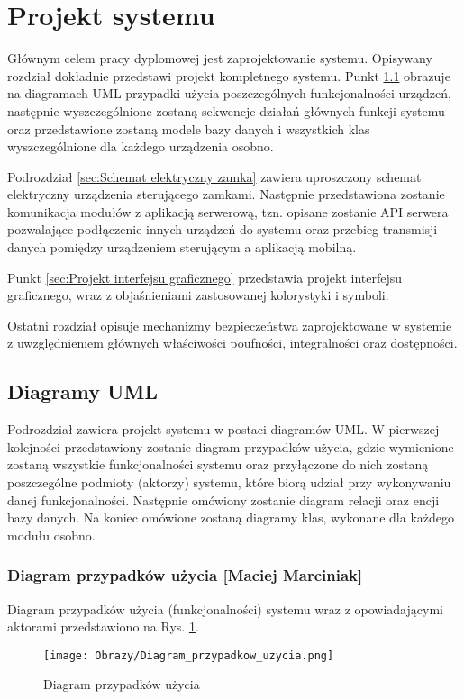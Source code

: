 % 
\newpage\section{Projekt systemu \textsl{\NazwaSys}}\label{sec:projekt}
Głównym celem pracy dyplomowej jest zaprojektowanie systemu. Opisywany rozdział dokładnie przedstawi projekt kompletnego systemu. Punkt \ref{sec:Diagramy UML} obrazuje na diagramach UML przypadki użycia poszczególnych funkcjonalności urządzeń, następnie wyszczególnione zostaną sekwencje działań głównych funkcji systemu oraz przedstawione zostaną modele bazy danych i wszystkich klas wyszczególnione dla każdego urządzenia osobno. 

Podrozdział \ref{sec:Schemat elektryczny zamka} zawiera uproszczony schemat elektryczny urządzenia sterującego zamkami. Następnie przedstawiona zostanie komunikacja modułów z aplikacją serwerową, tzn. opisane zostanie API serwera pozwalające podłączenie innych urządzeń do systemu oraz przebieg transmisji danych pomiędzy urządzeniem sterującym a aplikacją mobilną.

Punkt \ref{sec:Projekt interfejsu graficznego} przedstawia projekt interfejsu graficznego, wraz z objaśnieniami zastosowanej kolorystyki i symboli.

Ostatni rozdział opisuje mechanizmy bezpieczeństwa zaprojektowane w systemie z uwzględnieniem głównych właściwości poufności, integralności oraz dostępności.

\subsection{Diagramy UML}\label{sec:Diagramy UML}
Podrozdział zawiera projekt systemu w postaci diagramów UML. W pierwszej kolejności przedstawiony zostanie diagram przypadków użycia, gdzie wymienione zostaną wszystkie funkcjonalności systemu oraz przyłączone do nich zostaną poszczególne podmioty (aktorzy) systemu, które biorą udział przy wykonywaniu danej funkcjonalności. Następnie omówiony zostanie diagram relacji oraz encji bazy danych. Na koniec omówione zostaną diagramy klas, wykonane dla każdego modułu osobno. 
	\subsubsection[Diagram przypadków użycia]{Diagram przypadków użycia [Maciej Marciniak]}
	Diagram przypadków użycia (funkcjonalności) systemu wraz z opowiadającymi aktorami przedstawiono na Rys. \ref{diagram:diagram przypadków_użycia}.
	\begin{landscape}
		\begin{figure}[!h]
			\centering
			\texttt{[image: Obrazy/Diagram\_przypadkow\_uzycia.png]}
			\caption{Diagram przypadków użycia}
			\label{diagram:diagram przypadków_użycia}
		\end{figure}
	\end{landscape}
\newpage

